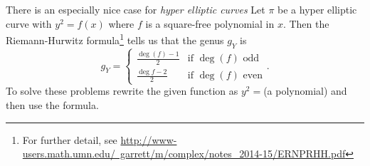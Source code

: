 \documentclass[10pt]{article}
\begin{document}
There is an especially nice case for \emph{hyper elliptic curves}
Let $\pi$ be a hyper elliptic curve with $y^2 = f(x)$ where $f$ is a square-free polynomial in $x$. Then the Riemann-Hurwitz formula\footnote{For further detail, see \href{PG's notes}{http://www-users.math.umn.edu/~garrett/m/complex/notes\_2014-15/ERNPRHH.pdf}} tells us that the genus $g_Y$ is 
\[g_Y  = \begin{cases} \frac{\deg(f)-1}{2} & \text{if } \deg(f) \text{ odd} \\ \frac{\deg{f}-2}{2} & \text{if } \deg(f) \text{ even}  \end{cases}. \]
To solve these problems rewrite the given function as $y^2 = $(a polynomial) and then use the formula.
\end{document}
